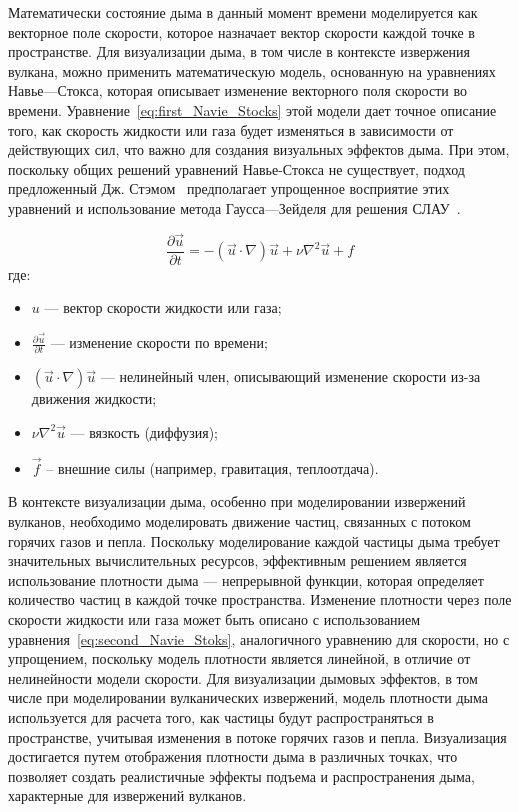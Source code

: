 Математически состояние дыма в данный момент времени моделируется как векторное поле скорости, которое назначает вектор скорости каждой точке в пространстве. Для визуализации дыма, в том числе в контексте извержения вулкана, можно применить математическую модель, основанную на уравнениях Навье---Стокса, которая описывает изменение векторного поля скорости во времени. Уравнение~\ref{eq:first_Navie_Stocks} этой модели дает точное описание того, как скорость жидкости или газа будет изменяться в зависимости от действующих сил, что важно для создания визуальных эффектов дыма. При этом, поскольку общих решений уравнений Навье-Стокса не существует, подход предложенный Дж. Стэмом~\cite{stam} предполагает упрощенное восприятие этих уравнений и использование метода Гаусса---Зейделя для решения СЛАУ~\cite{lit3, Gauss}.

\begin{equation}
	\label{eq:first_Navie_Stocks}
	\frac{\partial \vec{u}}{\partial t} = - (\vec{u} \cdot \nabla) \vec{u} + \nu \nabla^2 \vec{u} + f
\end{equation}
где:
\begin{itemize}
	\item $u$ --- вектор скорости жидкости или газа;
	\item $\frac{\partial \vec{u}}{\partial t}$ --- изменение скорости по времени;
	\item $(\vec{u} \cdot \nabla) \vec{u}$ --- нелинейный член, описывающий изменение скорости из-за движения жидкости;
	\item \(\nu \nabla^2 \vec{u}\) --- вязкость (диффузия);
	\item \(\vec{f}\) -- внешние силы (например, гравитация, теплоотдача).
\end{itemize}
	
В контексте визуализации дыма, особенно при моделировании извержений вулканов, необходимо моделировать движение частиц, связанных с потоком горячих газов и пепла. Поскольку моделирование каждой частицы дыма требует значительных вычислительных ресурсов, эффективным решением является использование плотности дыма --- непрерывной функции, которая определяет количество частиц в каждой точке пространства. Изменение плотности через поле скорости жидкости или газа может быть описано с использованием уравнения~\ref{eq:second_Navie_Stoks}, аналогичного уравнению для скорости, но с упрощением, поскольку модель плотности является линейной, в отличие от нелинейности модели скорости. Для визуализации дымовых эффектов, в том числе при моделировании вулканических извержений, модель плотности дыма используется для расчета того, как частицы будут распространяться в пространстве, учитывая изменения в потоке горячих газов и пепла. Визуализация достигается путем отображения плотности дыма в различных точках, что позволяет создать реалистичные эффекты подъема и распространения дыма, характерные для извержений вулканов. 

